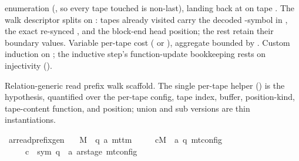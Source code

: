 \begin{isabellebody}
\begin{isamarkuptext}
  enumeration (, so every tape touched is
  non-last), landing back at  on tape
  .  The walk descriptor splits on : tapes already visited carry the decoded -symbol in
  , the exact re-synced , and the block-end
  head position; the rest retain their boundary values.  Variable
  per-tape cost ( or ), aggregate bounded by
  .  Custom induction on ; the
  inductive step's function-update bookkeeping rests on 
  injectivity ().%
\end{isamarkuptext}\isamarkuptrue%
%
\begin{isamarkuptext}%
Relation-generic read prefix walk scaffold.  The single
  per-tape helper () is the 
  hypothesis, quantified over the per-tape config, tape index,
  buffer, position-kind, tape-content function, and position; union
  and sub versions are thin instantiations.%
\end{isamarkuptext}\isamarkuptrue%
\isamarkupfalse%
\ ar{\isacharunderscore}{\kern0pt}read{\isacharunderscore}{\kern0pt}prefix{\isacharunderscore}{\kern0pt}gen{\isacharcolon}{\kern0pt}\isanewline
\ \ \ M\ {\isacharcolon}{\kern0pt}{\isacharcolon}{\kern0pt}\ {\isachardoublequoteopen}{\isacharparenleft}{\kern0pt}{\isacharprime}{\kern0pt}q{\isacharcomma}{\kern0pt}\ {\isacharprime}{\kern0pt}a{\isacharparenright}{\kern0pt}\ mttm{\isachardoublequoteclose}\isanewline
\ \ \ \ \ cM\ {\isacharcolon}{\kern0pt}{\isacharcolon}{\kern0pt}\ {\isachardoublequoteopen}{\isacharparenleft}{\kern0pt}{\isacharprime}{\kern0pt}a{\isacharcomma}{\kern0pt}\ {\isacharprime}{\kern0pt}q{\isacharparenright}{\kern0pt}\ mt{\isacharunderscore}{\kern0pt}config{\isachardoublequoteclose}\isanewline
\ \ \ \ \ c{}\ {\isacharcolon}{\kern0pt}{\isacharcolon}{\kern0pt}\ {\isachardoublequoteopen}{\isacharparenleft}{\kern0pt}sym{}{\isacharcomma}{\kern0pt}\ {\isacharprime}{\kern0pt}q\ {\isasymtimes}\ {\isacharprime}{\kern0pt}a\ ar{\isacharunderscore}{\kern0pt}stage{\isacharparenright}{\kern0pt}\ mt{\isacharunderscore}{\kern0pt}config{\isachardoublequoteclose}\isanewline

\end{isabellebody}
